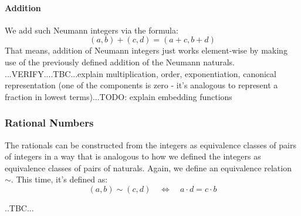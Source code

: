 \paragraph{Addition}
We add such Neumann integers via the formula:
\begin{equation}
 (a,b)+(c,d) = (a+c,b+d)
\end{equation}
That means, addition of Neumann integers just works element-wise by making use of the previously defined addition of the Neumann naturals. ...VERIFY....TBC...explain multiplication, order, exponentiation, canonical representation (one of the components is zero - it's analogous to represent a fraction in lowest terms)...TODO: explain embedding functions






\subsubsection{Rational Numbers} The rationals can be constructed from the integers as equivalence classes of pairs of integers in a way that is analogous to how we defined the integers as equivalence classes of pairs of naturals. Again, we define an equivalence relation $\sim$. This time, it's defined as:
\begin{equation}
(a,b) \sim (c,d) \quad \Leftrightarrow  \quad a \cdot d = c \cdot b
\end{equation}

..TBC...



